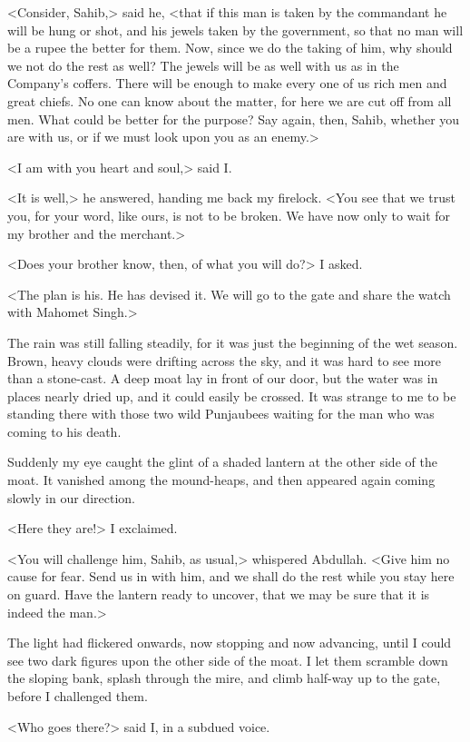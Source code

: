 <Consider, Sahib,> said he, <that if this man is taken by the commandant he will be hung or shot, and his jewels taken by the government, so that no man will be a rupee the better for them. Now, since we do the taking of him, why should we not do the rest as well? The jewels will be as well with us as in the Company's coffers. There will be enough to make every one of us rich men and great chiefs. No one can know about the matter, for here we are cut off from all men. What could be better for the purpose? Say again, then, Sahib, whether you are with us, or if we must look upon you as an enemy.>

<I am with you heart and soul,> said I\@.

<It is well,> he answered, handing me back my firelock. <You see that we trust you, for your word, like ours, is not to be broken. We have now only to wait for my brother and the merchant.>

<Does your brother know, then, of what you will do?> I asked.

<The plan is his. He has devised it. We will go to the gate and share the watch with Mahomet Singh.>

The rain was still falling steadily, for it was just the beginning of the wet season. Brown, heavy clouds were drifting across the sky, and it was hard to see more than a stone-cast. A deep moat lay in front of our door, but the water was in places nearly dried up, and it could easily be crossed. It was strange to me to be standing there with those two wild Punjaubees waiting for the man who was coming to his death.

Suddenly my eye caught the glint of a shaded lantern at the other side of the moat. It vanished among the mound-heaps, and then appeared again coming slowly in our direction.

<Here they are!> I exclaimed.

<You will challenge him, Sahib, as usual,> whispered Abdullah. <Give him no cause for fear. Send us in with him, and we shall do the rest while you stay here on guard. Have the lantern ready to uncover, that we may be sure that it is indeed the man.>

The light had flickered onwards, now stopping and now advancing, until I could see two dark figures upon the other side of the moat. I let them scramble down the sloping bank, splash through the mire, and climb half-way up to the gate, before I challenged them.

<Who goes there?> said I, in a subdued voice.

